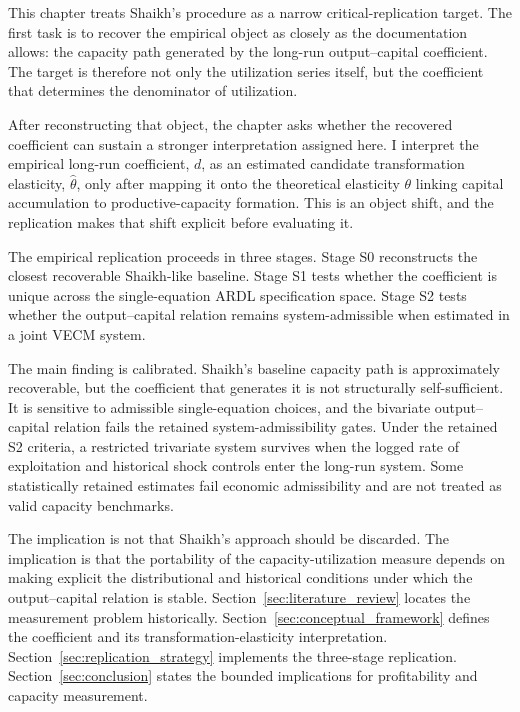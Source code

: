 \documentclass[11pt]{article}
\begin{document}
This chapter treats Shaikh's procedure as a narrow critical-replication target. The first task is to recover the empirical object as closely as the documentation allows: the capacity path generated by the long-run output--capital coefficient. The target is therefore not only the utilization series itself, but the coefficient that determines the denominator of utilization.

After reconstructing that object, the chapter asks whether the recovered coefficient can sustain a stronger interpretation assigned here. I interpret the empirical long-run coefficient, $d$, as an estimated candidate transformation elasticity, $\hat{\theta}$, only after mapping it onto the theoretical elasticity $\theta$ linking capital accumulation to productive-capacity formation. This is an object shift, and the replication makes that shift explicit before evaluating it.

The empirical replication proceeds in three stages. Stage S0 reconstructs the closest recoverable Shaikh-like baseline. Stage S1 tests whether the coefficient is unique across the single-equation ARDL specification space. Stage S2 tests whether the output--capital relation remains system-admissible when estimated in a joint VECM system.

The main finding is calibrated. Shaikh's baseline capacity path is approximately recoverable, but the coefficient that generates it is not structurally self-sufficient. It is sensitive to admissible single-equation choices, and the bivariate output--capital relation fails the retained system-admissibility gates. Under the retained S2 criteria, a restricted trivariate system survives when the logged rate of exploitation and historical shock controls enter the long-run system. Some statistically retained estimates fail economic admissibility and are not treated as valid capacity benchmarks.

The implication is not that Shaikh's approach should be discarded. The implication is that the portability of the capacity-utilization measure depends on making explicit the distributional and historical conditions under which the output--capital relation is stable. Section~\ref{sec:literature_review} locates the measurement problem historically. Section~\ref{sec:conceptual_framework} defines the coefficient and its transformation-elasticity interpretation. Section~\ref{sec:replication_strategy} implements the three-stage replication. Section~\ref{sec:conclusion} states the bounded implications for profitability and capacity measurement.
\end{document}
